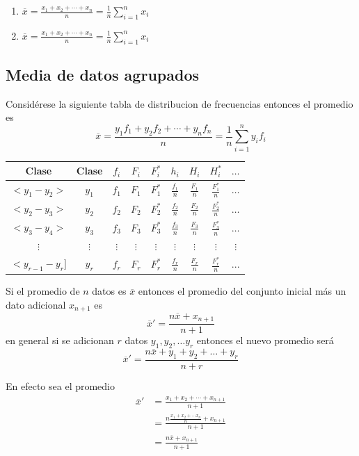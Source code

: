 \documentclass[10pt,]{krantz}
\providecommand{\tightlist}{%
  \setlength{\itemsep}{0pt}\setlength{\parskip}{0pt}}
\theoremstyle{definition}
\theoremstyle{definition}
\theoremstyle{definition}
\theoremstyle{remark}
\let\BeginKnitrBlock\begin \let\EndKnitrBlock\end
\begin{document}
\begin{enumerate}
\def\labelenumi{\arabic{enumi}.}
\tightlist
\item
  \(\overline{x}=\frac{x_1+x_2+\cdots+x_n}{n}=\frac{1}{n}\sum_{i=1}^nx_i\)
\item
  \(\overline{x}=\frac{x_1+x_2+\cdots+x_n}{n}=\frac{1}{n}\sum_{i=1}^nx_i\)
\end{enumerate}

\hypertarget{media-de-datos-agrupados}{%
\subsection{Media de datos agrupados}\label{media-de-datos-agrupados}}

Considérese la siguiente tabla de distribucion de frecuencias entonces el promedio es \[\overline{x}=\frac{y_1f_1+y_2f_2+\cdots+y_nf_n}{n}=\frac{1}{n}\sum_{i=1}^ny_if_i\]

\begin{longtable}[]{@{}ccccccccc@{}}
\toprule
Clase & Clase & \(f_i\) & \(F_i\) & \(F_i^*\) & \(h_i\) & \(H_i\) & \(H_i^*\) & \(\ldots\)\tabularnewline
\midrule
\endhead
\(<y_1-y_2>\) & \(y_1\) & \(f_1\) & \(F_1\) & \(F_1^*\) & \(\frac{f_1}{n}\) & \(\frac{F_1}{n}\) & \(\frac{F_1^*}{n}\) & \(\ldots\)\tabularnewline
\(<y_2-y_3>\) & \(y_2\) & \(f_2\) & \(F_2\) & \(F_2^*\) & \(\frac{f_2}{n}\) & \(\frac{F_2}{n}\) & \(\frac{F_2^*}{n}\) & \(\ldots\)\tabularnewline
\(<y_3-y_4>\) & \(y_3\) & \(f_3\) & \(F_3\) & \(F_3^*\) & \(\frac{f_3}{n}\) & \(\frac{F_3}{n}\) & \(\frac{F_3^*}{n}\) & \(\ldots\)\tabularnewline
\(\vdots\) & \(\vdots\) & \(\vdots\) & \(\vdots\) & \(\vdots\) & \(\vdots\) & \(\vdots\) & \(\vdots\) & \(\vdots\)\tabularnewline
\(<y_{r-1}-y_r]\) & \(y_r\) & \(f_r\) & \(F_r\) & \(F_r^*\) & \(\frac{f_r}{n}\) & \(\frac{F_r}{n}\) & \(\frac{F_r^*}{n}\) & \(...\)\tabularnewline
\bottomrule
\end{longtable}

\BeginKnitrBlock{exercise}
\protect\hypertarget{exr:unnamed-chunk-9}{}{\label{exr:unnamed-chunk-9} }Si el promedio de \(n\) datos es \(\overline{x}\) entonces el promedio del conjunto inicial más un dato adicional \(x_{n+1}\) es \[\overline{x}'=\frac{n\overline{x}+x_{n+1}}{n+1}\] en general si se adicionan \(r\) datos \(y_1, y_2, \ldots y_r\) entonces el nuevo promedio será \[\overline{x}'=\frac{n\overline{x}+y_{1}+y_2+\ldots+y_r}{n+r}\]
\EndKnitrBlock{exercise}

\BeginKnitrBlock{solution}
{}En efecto sea el promedio
\begin{align*}
\overline{x}'&=\frac{x_1+x_2+\cdots+x_{n+1}}{n+1}\\
&=\frac{n\frac{x_1+x_2+\cdots x_n}{n}+x_{n+1}}{n+1}\\
&=\frac{n\overline{x}+x_{n+1}}{n+1}
\end{align*}
\EndKnitrBlock{solution}
\end{document}
